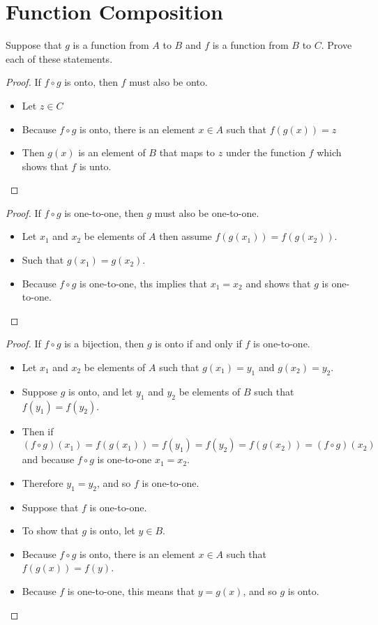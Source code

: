 \section{Function Composition}
Suppose that \(g\) is a function from \(A\) to \(B\) and \(f\) is a function from \(B\) to \(C\). Prove
each of these statements.
\begin{proof}
    If \(f \circ g\) is onto, then \(f\) must also be onto.
    \begin{itemize}
        \item Let \(z \in C\)
        \item Because \(f \circ g\) is onto, there is an element \(x \in A\) such that \(f(g(x)) = z\)
        \item Then \(g(x)\) is an element of \(B\) that maps to \(z\) under the function \(f\) which shows that \(f\) is unto.
    \end{itemize}
\end{proof}
\begin{proof}
    If \(f \circ g\) is one-to-one, then \(g\) must also be one-to-one.
    \begin{itemize}
        \item Let \(x_1\) and \(x_2\) be elements of \(A\) then assume \(f(g(x_1)) = f(g(x_2))\).
        \item Such that \(g(x_1) = g(x_2)\).
        \item Because \(f \circ g\) is one-to-one, ths implies that \(x_1 = x_2\) and shows that \(g\) is one-to-one.
    \end{itemize}
\end{proof}
\begin{proof}
    If \(f \circ g\) is a bijection, then \(g\) is onto if and only if \(f\) is one-to-one.
    \begin{itemize}
        \item Let \(x_1\) and \(x_2\) be elements of \(A\) such that \(g(x_1) = y_1\) and \(g(x_2) = y_2\).
        \item Suppose \(g\) is onto, and let \(y_1\) and \(y_2\) be elements of \(B\) such that \(f(y_1) = f(y_2)\).
        \item Then if \((f \circ g)(x_1) = f(g(x_1)) = f(y_1) = f(y_2) = f(g(x_2)) = (f \circ g)(x_2)\) and because \(f \circ g\) is one-to-one \(x_1 = x_2\).
        \item Therefore \(y_1 = y_2\), and so \(f\) is one-to-one.
    \end{itemize}
    \begin{itemize}
        \item Suppose that \(f\) is one-to-one.
        \item To show that \(g\) is onto, let \(y \in B\).
        \item Because \(f \circ g\) is onto, there is an element \(x \in A\) such that \(f(g(x)) = f(y)\).
        \item Because \(f\) is one-to-one, this means that \(y = g(x)\), and so \(g\) is onto.
    \end{itemize}
\end{proof}
